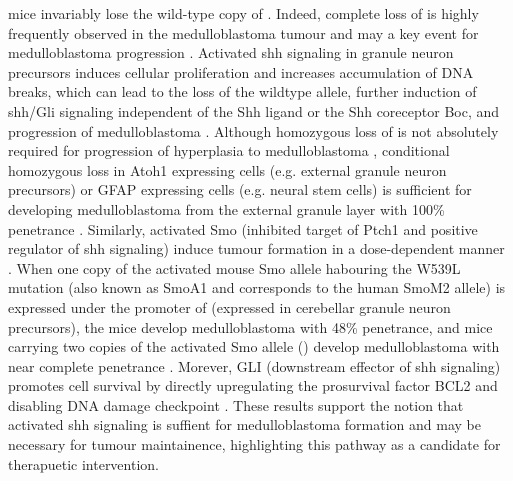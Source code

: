 mice invariably lose the wild-type copy of  . Indeed, complete loss of  is highly frequently observed in the medulloblastoma tumour and may a key event for medulloblastoma progression . Activated \gls{shh} signaling in \high{-/+} granule neuron precursors induces cellular proliferation and increases accumulation of DNA breaks, which can lead to the loss of the wildtype  allele, further induction of \gls{shh}/Gli signaling independent of the Shh ligand or the Shh coreceptor Boc, and progression of medulloblastoma . Although homozygous loss of  is not absolutely required for progression of hyperplasia to medulloblastoma , conditional homozygous loss in Atoh1 expressing cells (e.g. external granule neuron precursors) or GFAP expressing cells (e.g. neural stem cells) is sufficient for developing medulloblastoma from the external granule layer with 100\% penetrance . Similarly, activated Smo (inhibited target of Ptch1 and positive regulator of \gls{shh} signaling) induce tumour formation in a dose-dependent manner . When one copy of the activated mouse Smo allele habouring the W539L mutation (also known as SmoA1 and corresponds to the human SmoM2 allele) is expressed under the promoter of  (expressed in cerebellar granule neuron precursors), the mice develop medulloblastoma with 48\% penetrance, and mice carrying two copies of the activated Smo allele () develop medulloblastoma with near complete penetrance . Morever, GLI (downstream effector of \gls{shh} signaling) promotes cell survival by directly upregulating the prosurvival factor BCL2  and disabling DNA damage checkpoint . These results support the notion that activated \gls{shh} signaling is suffient for medulloblastoma formation and may be necessary for tumour maintainence, highlighting this pathway as a candidate for therapuetic intervention.



